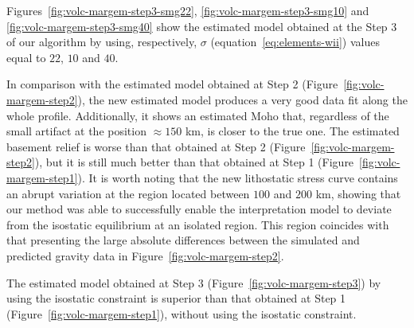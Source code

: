 \documentclass[manuscript]{geophysics}
\begin{document}
Figures~\ref{fig:volc-margem-step3-smg22}, \ref{fig:volc-margem-step3-smg10} and 
\ref{fig:volc-margem-step3-smg40} show the estimated model obtained at
the Step 3 of our algorithm by using, respectively, $\sigma$
(equation~\ref{eq:elements-wii}) values equal to $22$, $10$ and $40$. 



In comparison with the estimated model obtained at Step 2 
(Figure~\ref{fig:volc-margem-step2}), the new estimated model produces a very good 
data fit along the whole profile. Additionally, it shows an estimated Moho that,
regardless of the small artifact at the position $\approx 150$ km, is
closer to the true one.
The estimated basement relief is worse than that obtained at Step 2
(Figure~\ref{fig:volc-margem-step2}), but it is still much better than that obtained
at Step 1 (Figure~\ref{fig:volc-margem-step1}).
It is worth noting that the new lithostatic stress curve contains an abrupt variation
at the region located between $100$ and $200$ km,
showing that our method was able to successfully enable 
the interpretation model to deviate from the isostatic equilibrium at an
isolated region. This region coincides with that presenting the large absolute 
differences between the simulated and predicted gravity data in Figure~\ref{fig:volc-margem-step2}.

The estimated model obtained at Step 3 (Figure~\ref{fig:volc-margem-step3})
by using the isostatic constraint is superior than that
obtained at Step 1 (Figure~\ref{fig:volc-margem-step1}),
without using the isostatic constraint.
\end{document}
